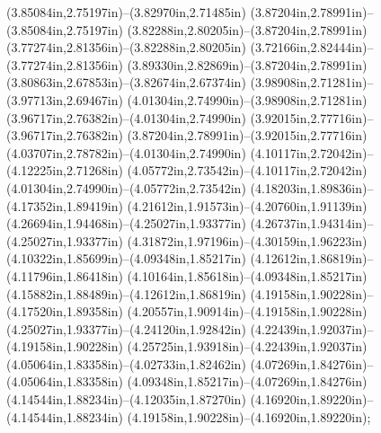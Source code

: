 (3.85084in,2.75197in)--(3.82970in,2.71485in) (3.87204in,2.78991in)--(3.85084in,2.75197in) (3.82288in,2.80205in)--(3.87204in,2.78991in) (3.77274in,2.81356in)--(3.82288in,2.80205in) (3.72166in,2.82444in)--(3.77274in,2.81356in) (3.89330in,2.82869in)--(3.87204in,2.78991in) (3.80863in,2.67853in)--(3.82674in,2.67374in) (3.98908in,2.71281in)--(3.97713in,2.69467in) (4.01304in,2.74990in)--(3.98908in,2.71281in) (3.96717in,2.76382in)--(4.01304in,2.74990in) (3.92015in,2.77716in)--(3.96717in,2.76382in) (3.87204in,2.78991in)--(3.92015in,2.77716in) (4.03707in,2.78782in)--(4.01304in,2.74990in) (4.10117in,2.72042in)--(4.12225in,2.71268in) (4.05772in,2.73542in)--(4.10117in,2.72042in) (4.01304in,2.74990in)--(4.05772in,2.73542in) (4.18203in,1.89836in)--(4.17352in,1.89419in) (4.21612in,1.91573in)--(4.20760in,1.91139in) (4.26694in,1.94468in)--(4.25027in,1.93377in) (4.26737in,1.94314in)--(4.25027in,1.93377in) (4.31872in,1.97196in)--(4.30159in,1.96223in) (4.10322in,1.85699in)--(4.09348in,1.85217in) (4.12612in,1.86819in)--(4.11796in,1.86418in) (4.10164in,1.85618in)--(4.09348in,1.85217in) (4.15882in,1.88489in)--(4.12612in,1.86819in) (4.19158in,1.90228in)--(4.17520in,1.89358in) (4.20557in,1.90914in)--(4.19158in,1.90228in) (4.25027in,1.93377in)--(4.24120in,1.92842in) (4.22439in,1.92037in)--(4.19158in,1.90228in) (4.25725in,1.93918in)--(4.22439in,1.92037in) (4.05064in,1.83358in)--(4.02733in,1.82462in) (4.07269in,1.84276in)--(4.05064in,1.83358in) (4.09348in,1.85217in)--(4.07269in,1.84276in) (4.14544in,1.88234in)--(4.12035in,1.87270in) (4.16920in,1.89220in)--(4.14544in,1.88234in) (4.19158in,1.90228in)--(4.16920in,1.89220in);
